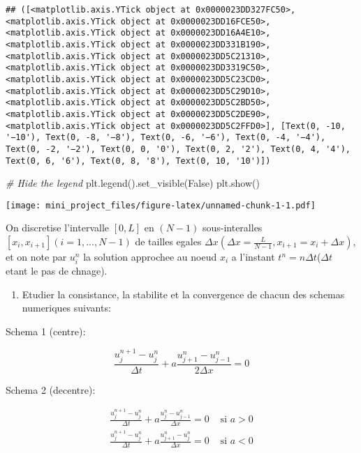 \documentclass[
]{article}
\newenvironment{Shaded}{\begin{snugshade}}{\end{snugshade}}
\newcommand{\CommentTok}[1]{\textcolor[rgb]{0.56,0.35,0.01}{\textit{#1}}}
\newcommand{\NormalTok}[1]{#1}
\newcommand{\VariableTok}[1]{\textcolor[rgb]{0.00,0.00,0.00}{#1}}
\providecommand{\tightlist}{%
  \setlength{\itemsep}{0pt}\setlength{\parskip}{0pt}}
\begin{document}
\begin{verbatim}
## ([<matplotlib.axis.YTick object at 0x0000023DD327FC50>, <matplotlib.axis.YTick object at 0x0000023DD16FCE50>, <matplotlib.axis.YTick object at 0x0000023DD16A4E10>, <matplotlib.axis.YTick object at 0x0000023DD331B190>, <matplotlib.axis.YTick object at 0x0000023DD5C21310>, <matplotlib.axis.YTick object at 0x0000023DD3319C50>, <matplotlib.axis.YTick object at 0x0000023DD5C23CD0>, <matplotlib.axis.YTick object at 0x0000023DD5C29D10>, <matplotlib.axis.YTick object at 0x0000023DD5C2BD50>, <matplotlib.axis.YTick object at 0x0000023DD5C2DE90>, <matplotlib.axis.YTick object at 0x0000023DD5C2FFD0>], [Text(0, -10, '−10'), Text(0, -8, '−8'), Text(0, -6, '−6'), Text(0, -4, '−4'), Text(0, -2, '−2'), Text(0, 0, '0'), Text(0, 2, '2'), Text(0, 4, '4'), Text(0, 6, '6'), Text(0, 8, '8'), Text(0, 10, '10')])
\end{verbatim}

\begin{Shaded}
\begin{Highlighting}[]
\CommentTok{\# Hide the legend}
\NormalTok{plt.legend().set\_visible(}\VariableTok{False}\NormalTok{)}
\NormalTok{plt.show()}
\end{Highlighting}
\end{Shaded}

\texttt{[image: mini\_project\_files/figure-latex/unnamed-chunk-1-1.pdf]}

On discretise l'intervalle \([0, L]\) en \((N-1)\) sous-interalles
\([x_{i}, x_{i+1}](i=1, ..., N-1)\) de tailles egales
\(\Delta x(\Delta x=\frac{L}{N-1}, x_{i+1}=x_{i}+\Delta x)\), et on note
par \(u_{i}^{n}\) la solution approchee au noeud \(x_{i}\) a l'instant
\(t^{n}=n\Delta t\)(\(\Delta t\) etant le pas de chnage).

\begin{enumerate}
\def\labelenumi{\arabic{enumi})}
\setcounter{enumi}{1}
\tightlist
\item
  Etudier la consistance, la stabilite et la convergence de chacun des
  schemas numeriques suivants:
\end{enumerate}

Schema 1 (centre):

\[
\frac{u_{j}^{n+1}-u_{j}^{n}}{\Delta t} + a\frac{u_{j+1}^{n}-u_{j-1}^{n}}{2\Delta x} = 0
\]

Schema 2 (decentre):

\[
\begin{aligned}
\frac{u_{j}^{n+1}-u_{j}^{n}}{\Delta t} + a\frac{u_{j}^{n}-u_{j-1}^{n}}{\Delta x} = 0 & \text{ si } a > 0\\
\frac{u_{j}^{n+1}-u_{j}^{n}}{\Delta t} + a\frac{u_{j+1}^{n}-u_{j}^{n}}{\Delta x} = 0 & \text{ si } a < 0
\end{aligned}
\]
\end{document}
